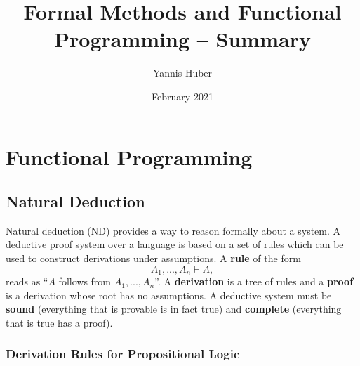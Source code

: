 \documentclass{ethz-assignment}
\title{Formal Methods and Functional Programming -- Summary}
\author{Yannis Huber}
\date{February 2021}
\begin{document}
\maketitle
\thispagestyle{fancy}

\section{Functional Programming}



\subsection{Natural Deduction}
Natural deduction (ND) provides a way to reason formally about a system. A deductive proof system over a language is based on a set of rules which can be used to construct derivations under assumptions. A \textbf{rule} of the form 
\[A_1, ..., A_n \vdash A,\]
reads as \enquote{$A$ follows from $A_1, ..., A_n$}. A \textbf{derivation} is a tree of rules and a \textbf{proof} is a derivation whose root has no assumptions. A deductive system must be \textbf{sound} (everything that is provable is in fact true) and \textbf{complete} (everything that is true has a proof).

\subsubsection{Derivation Rules for Propositional Logic}
\end{document}
